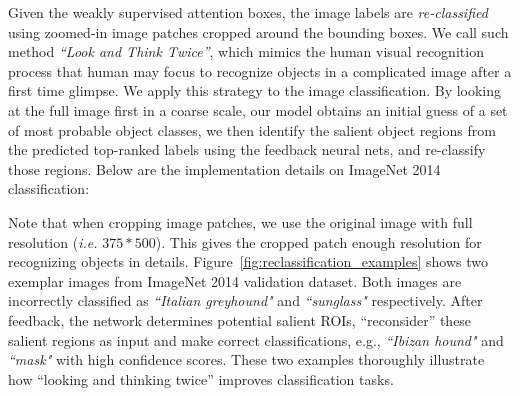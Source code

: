 Given the weakly supervised attention boxes, the image labels are {\em re-classified} using zoomed-in image patches cropped around the bounding boxes. We call such method {\em ``Look and Think Twice''}, which mimics the human visual recognition process that human may focus to recognize objects in a complicated image after a first time glimpse. We apply this strategy to the image classification. By looking at the full image first in a coarse scale, our model obtains an initial guess of a set
of most probable object classes, we then identify the salient object regions from the predicted top-ranked labels using the feedback neural nets, and re-classify those regions. Below are the implementation details on ImageNet 2014 classification:
\begin{center}
\end{center}

Note that when cropping image patches, we use the original image with full resolution ({\em i.e.} $375*500$). This gives the cropped patch enough resolution for recognizing objects in details. Figure~\ref{fig:reclassification_examples} shows two exemplar images from ImageNet 2014 validation dataset. Both images are incorrectly classified as {\em ``Italian greyhound"} and {\em ``sunglass"} respectively. After feedback, the network determines potential salient ROIs, ``reconsider'' these salient regions as input and make correct classifications, e.g., {\em ``Ibizan hound"} and {\em ``mask"} with high confidence scores. These two examples thoroughly illustrate how ``looking and thinking twice'' improves classification tasks. 

